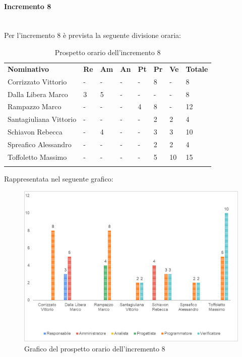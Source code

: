 \paragraph{Incremento 8} \mbox{} \\
Per l'incremento 8 è prevista la seguente divisione oraria:
\begin{longtable} {				
		>{}p{40mm}  
		>{}p{8mm}
		>{}p{8mm}
		>{}p{8mm}
		>{}p{8mm}
		>{}p{8mm}
		>{}p{8mm}
		>{}p{12mm}				
	}			
	\rowcolor{gray!50}
	\textbf{Nominativo} & \textbf{Re} & \textbf{Am} & \textbf{An} & \textbf{Pt} & \textbf{Pr} & \textbf{Ve} & \textbf{Totale}	\TBstrut \\ [2mm]
	Corrizzato Vittorio & - & - & - & - & 8 & - & 8 \TBstrut \\ [2mm]
	Dalla Libera Marco & 3 & 5 & - & - & - & - & 8 \TBstrut \\ [2mm]
	Rampazzo Marco & - & - & - & 4 & 8 & - & 12 \TBstrut \\ [2mm]
	Santagiuliana Vittorio & - & - & - & - & 2 & 2 & 4 \TBstrut \\ [2mm]
	Schiavon Rebecca & - & 4 & - & - & 3 & 3 & 10 \TBstrut \\ [2mm]
	Spreafico Alessandro & - & - & - & - & 2 & 2 & 4 \TBstrut \\ [2mm]
	Toffoletto Massimo & - & - & - & - & 5 & 10 & 15 \TBstrut \\ [2mm]
	\rowcolor{white}
	\caption{Prospetto orario dell'incremento 8}
\end{longtable}
Rappresentata nel seguente grafico:
\begin{figure} [H]
	\includegraphics[width=\linewidth]{./img/Grafici/ra1.png}
	\caption{Grafico del prospetto orario dell'incremento 8}
\end{figure}

